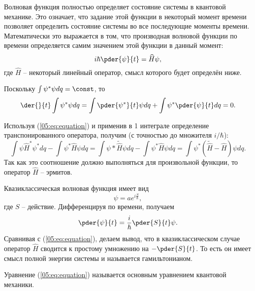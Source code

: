 Волновая функция полностью определяет состояние системы в квантовой механике.
Это означает, что задание этой функции в  некоторый момент времени позволяет
определить состояние системы во все последующие моменты времени. Математически
это выражается в том, что производная волновой функции по времени определяется
самим значением этой функции в данный момент:
\begin{equation}
    i\hbar\pder{\psi}{t} = \hat{H}\psi,
    \label{05:eq:equation}
\end{equation}
где \( \hat{H} \) -- некоторый линейный оператор, смысл которого будет определён
ниже.

Поскольку \( \int\psi^*\psi dq = \const \), то
\[
    \der{}{t}\int\psi^*\psi dq = \int\pder{\psi^*}{t}\psi dq +
    \int\psi^*\pder{\psi}{t} dq = 0.
\]

Используя (\ref{05:eq:equation}) и применив в 1 интеграле определение
транспонированного оператора, получим (с точностью до множителя \( i/\hbar \)):
\[
    \int\psi\hat{H}^*\psi^* dq - \int\psi^*\hat{H}\psi dq =
    \int\psi*\tilde{\hat{H}}\psi dq - \int\psi^*\hat{H}\psi dq =
    \int\psi^*(\tilde{\hat{H}} - \hat{H})\psi dq.
\]
Так как это соотношение должно выполняться для произвольной функции, то оператор
\( \hat{H} \) -- эрмитов.

Квазиклассическая волновая функция имеет вид
\[
    \psi = ae^{i\frac{S}{\hbar}},
\]
где \( S \) -- действие. Дифференцируя по времени, получаем
\[
    \pder{\psi}{t} = \frac{i}{\hbar}\pder{S}{t}\psi.
\]
Сравнивая с (\ref{05:eq:equation}), делаем вывод, что в квазиклассическом случае
оператор \( \hat{H} \) сводится к простому умножению на \( -\pder{S}{t} \). То
есть он имеет смысл полной энергии системы и называется гамильтонианом.

Уравнение (\ref{05:eq:equation}) называется основным уравнением квантовой
механики.
